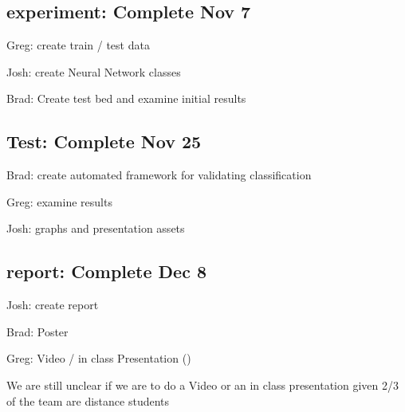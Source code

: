 \documentclass{article}
\begin{document}
\subsection{experiment: Complete Nov 7}
Greg: create train / test data

Josh: create Neural Network classes

Brad: Create test bed and examine initial results

\subsection{Test: Complete Nov 25}
Brad: create automated framework for validating classification

Greg: examine results

Josh: graphs and presentation assets

\subsection{report: Complete Dec 8}
Josh: create report

Brad: Poster

Greg: Video / in class Presentation ()

We are still unclear if we are to do a Video or an in class presentation given 2/3 of the team are distance students


\nocite{*}


\end{document}
